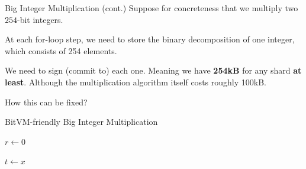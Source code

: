 \documentclass{zkdl-presentation-template}
\begin{document}
    \begin{frame}{Big Integer Multiplication (cont.)}
        Suppose for concreteness that we multiply two $254$-bit integers.

        At each for-loop step, we need to store the binary decomposition of one integer, which consists of 254 elements. 

        We need to sign (commit to) each one. Meaning we have \textbf{254kB} for any shard \textbf{at least}. Although the multiplication algorithm itself costs roughly 100kB.

        How this can be fixed?
    \end{frame}

    \begin{frame}{BitVM-friendly Big Integer Multiplication}
        \small
        \begin{algorithm}[H]
  \caption{BitVM-friendly double-and-add method}\label{alg:double_and_add}
  
  $r \gets 0$

  $t \gets x$

  

  \label{alg:double_and_add_bitvm_friendly}
\end{algorithm}
    \end{frame}
\end{document}
